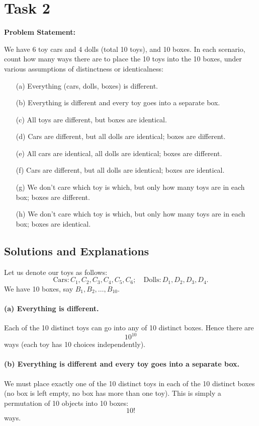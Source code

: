 \documentclass[docmute]{article}
\begin{document}
\bigskip

\section*{Task 2}

\textbf{Problem Statement:}

We have 6 toy cars and 4 dolls (total 10 toys), and 10 boxes. In each scenario, count how many ways there are to place the 10 toys into the 10 boxes, under various assumptions of distinctness or identicalness:

\begin{enumerate}
  \item[(a)] Everything (cars, dolls, boxes) is different.
  \item[(b)] Everything is different and every toy goes into a separate box.
  \item[(c)] All toys are different, but boxes are identical.
  \item[(d)] Cars are different, but all dolls are identical; boxes are different.
  \item[(e)] All cars are identical, all dolls are identical; boxes are different.
  \item[(f)] Cars are different, but all dolls are identical; boxes are identical.
  \item[(g)] We don’t care which toy is which, but only how many toys are in each box; boxes are different.
  \item[(h)] We don’t care which toy is which, but only how many toys are in each box; boxes are identical.
\end{enumerate}

\subsection*{Solutions and Explanations}

Let us denote our toys as follows:
\[
\text{Cars}: C_1, C_2, C_3, C_4, C_5, C_6; 
\quad
\text{Dolls}: D_1, D_2, D_3, D_4.
\]
We have 10 boxes, say \(B_1, B_2, \dots, B_{10}\).

\paragraph{(a) Everything is different.}
Each of the 10 distinct toys can go into any of 10 distinct boxes. Hence there are 
\[
10^{10}
\]
ways (each toy has 10 choices independently).

\paragraph{(b) Everything is different and every toy goes into a separate box.}
We must place exactly one of the 10 distinct toys in each of the 10 distinct boxes (no box is left empty, no box has more than one toy). This is simply a permutation of 10 objects into 10 boxes:
\[
10! 
\]
ways.
\end{document}
